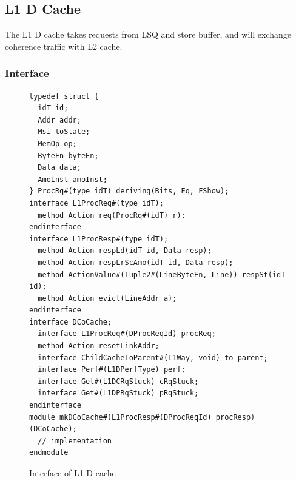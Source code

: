 \subsection{L1 D Cache}\label{sec:d-cache}

The L1 D cache takes requests from LSQ and store buffer, and will exchange coherence traffic with L2 cache.

\subsubsection{Interface}

\begin{figure}
\begin{lstlisting}[caption={}]
typedef struct {
  idT id;
  Addr addr;
  Msi toState;
  MemOp op;
  ByteEn byteEn;
  Data data;
  AmoInst amoInst;
} ProcRq#(type idT) deriving(Bits, Eq, FShow);
interface L1ProcReq#(type idT);
  method Action req(ProcRq#(idT) r);
endinterface
interface L1ProcResp#(type idT);
  method Action respLd(idT id, Data resp);
  method Action respLrScAmo(idT id, Data resp);
  method ActionValue#(Tuple2#(LineByteEn, Line)) respSt(idT id);
  method Action evict(LineAddr a);
endinterface
interface DCoCache;
  interface L1ProcReq#(DProcReqId) procReq;
  method Action resetLinkAddr;
  interface ChildCacheToParent#(L1Way, void) to_parent;
  interface Perf#(L1DPerfType) perf;
  interface Get#(L1DCRqStuck) cRqStuck;
  interface Get#(L1DPRqStuck) pRqStuck;
endinterface
module mkDCoCache#(L1ProcResp#(DProcReqId) procResp)(DCoCache);
  // implementation
endmodule
\end{lstlisting}
\caption{Interface of L1 D cache}\label{fig:d-cache-ifc}
\end{figure}

